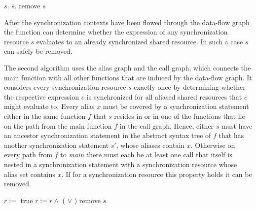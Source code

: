 \begin{algorithmic}
\State {}
 
      \State $\overline{s}.$ 
    \EndIf
  \EndFor
\EndFor
\Repeat {}
     
      \State $\overline{s}.$
    \EndIf
  \EndFor
{}
 
      \State remove $s$
  \EndIf
\EndFor
\EndFunction
\end{algorithmic}
After the synchronization contexts have been flowed through the data-flow graph the function can determine whether the expression of any synchronization resource $s$ evaluates to an already synchronized shared resource. In such a case $s$ can safely be removed. 

The second algorithm uses the alias graph and the call graph, which connects the main function with all other functions that are induced by the data-flow graph. It considers every synchronization resource $s$ exactly once by determining whether the respective expression $e$ is synchronized for all aliased shared resources that $e$ might evaluate to. Every alias $x$ must  be covered by a synchronization statement either in the same function $f$ that $s$ resides in or in one of the functions that lie on the path from the main function $f$ in the call graph. Hence, either $s$ must have an ancestor synchronization statement in the abstract syntax tree of $f$ that has another synchronization statement $s'$, whose aliases contain $x$. Otherwise on every path from $f$ to \textit{main} there must each be at least one call that itself is nested in a synchronization statement with a synchronization resource whose alias set contains $x$. If for a synchronization resource this property holds it can be removed.

\begin{algorithmic}
\State {}
  \State $r :=$ true 
    \State $r := r \land$ ( $\lor$  )
  \EndFor
    \State remove $s$
  \EndIf
\EndFor
\EndFunction
\end{algorithmic}



